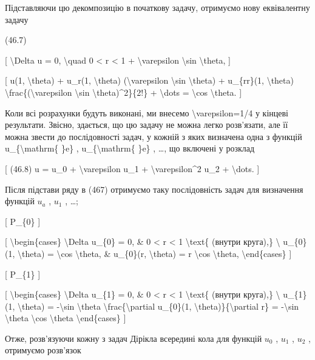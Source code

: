 \documentclass[
]{article}
\begin{document}
Підставляючи цю декомпозицію в початкову задачу, отримуємо нову
еквівалентну задачу

(46.7)

{[} \textbackslash Delta u = 0, \textbackslash quad 0 \textless{} r
\textless{} 1 + \textbackslash varepsilon \textbackslash sin
\textbackslash theta, {]}

{[} u(1, \textbackslash theta) + u\_r(1, \textbackslash theta)
(\textbackslash varepsilon \textbackslash sin \textbackslash theta) +
u\_\{rr\}(1, \textbackslash theta)
\textbackslash frac\{(\textbackslash varepsilon \textbackslash sin
\textbackslash theta)\^{}2\}\{2!\} + \textbackslash dots =
\textbackslash cos \textbackslash theta. {]}

Коли всі розрахунки будуть виконані, ми внесемо
\textbackslash varepsilon=1/4 у кінцеві результати. Звісно, здається, що
цю задачу не можна легко розв'язати, але її можна звести до
послідовності задач, у кожній з яких визначена одна з функцій
u\_\{\textbackslash mathrm\{ \}e\} , u\_\{\textbackslash mathrm\{ \}e\}
, \ldots, що включені у розклад

{[} (46.8) u = u\_0 + \textbackslash varepsilon u\_1 +
\textbackslash varepsilon\^{}2 u\_2 + \textbackslash dots. {]}

Після підстави ряду в (467) отримуємо таку послідовність задач для
визначення функцій \(u_a\) , \(u_1\) , \ldots;

{[} P\_\{0\} {]}

{[} \textbackslash begin\{cases\} \textbackslash Delta u\_\{0\} = 0, \&
0 \textless{} r \textless{} 1 \textbackslash text\{ (внутри круга),\}
\textbackslash{} u\_\{0\}(1, \textbackslash theta) = \textbackslash cos
\textbackslash theta, \& u\_\{0\}(r, \textbackslash theta) = r
\textbackslash cos \textbackslash theta, \textbackslash end\{cases\} {]}

{[} P\_\{1\} {]}

{[} \textbackslash begin\{cases\} \textbackslash Delta u\_\{1\} = 0, \&
0 \textless{} r \textless{} 1 \textbackslash text\{ (внутри круга),\}
\textbackslash{} u\_\{1\}(1, \textbackslash theta) = -\textbackslash sin
\textbackslash theta \textbackslash frac\{\textbackslash partial
u\_\{0\}(1, \textbackslash theta)\}\{\textbackslash partial r\} =
-\textbackslash sin \textbackslash theta \textbackslash cos
\textbackslash theta \textbackslash end\{cases\} {]}

Отже, розв'язуючи кожну з задач Дірікла всередині кола для функцій
\(u_0\) , \(u_1\) , \(u_2\) , отримуємо розв'язок
\end{document}
